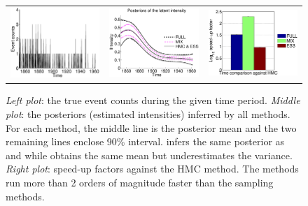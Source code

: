\begin{figure}
\centering
\begin{tabular}{ccc}
\includegraphics[width=0.3\linewidth]{figures/loggcp-intensity.eps} &
\includegraphics[width=0.3\linewidth]{figures/loggcp.eps} &
\includegraphics[width=0.3\linewidth]{figures/loggcp-time.eps}
\end{tabular}
\caption{\emph{Left plot}: the true event counts during the given time period. \emph{Middle plot}: the posteriors (estimated intensities) inferred by all methods. For each method, the middle line is the posterior mean and the two remaining lines enclose 90\% interval. \agpfull \space infers the same posterior as \hmc \space and \ess \space while \agpmix \space obtains the same mean but underestimates the variance. \emph{Right plot}: speed-up factors against the HMC method. The \agp \space methods run more than 2 orders of magnitude faster than the sampling methods. %
}
\label{fig:loggcp}
\end{figure}

